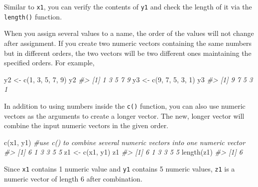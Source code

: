 \documentclass[
]{book}
\newenvironment{Shaded}{\begin{snugshade}}{\end{snugshade}}
\newcommand{\CommentTok}[1]{\textcolor[rgb]{0.56,0.35,0.01}{\textit{#1}}}
\newcommand{\DecValTok}[1]{\textcolor[rgb]{0.00,0.00,0.81}{#1}}
\newcommand{\FunctionTok}[1]{\textcolor[rgb]{0.00,0.00,0.00}{#1}}
\newcommand{\NormalTok}[1]{#1}
\newcommand{\OtherTok}[1]{\textcolor[rgb]{0.56,0.35,0.01}{#1}}
\newenvironment{blackbox}{
  \definecolor{shadecolor}{rgb}{0, 0, 0}  %
  \color{white}
  \begin{shaded}}
 {\end{shaded}}
\newenvironment{infobox}[1]
  {
  \begin{itemize}
  \renewcommand{\labelitemi}{
    \raisebox{-.7\height}[0pt][0pt]{
      {\setkeys{Gin}{width=3em,keepaspectratio}
        \texttt{[image: pics/\#1]}}
    }
  }
  \setlength{\fboxsep}{1em}
  \begin{blackbox}
  \item
  }
  {
  \end{blackbox}
  \end{itemize}
  }
\begin{document}
Similar to \texttt{x1}, you can verify the contents of \texttt{y1} and check the length of it via the \texttt{length()} function.

\begin{infobox}{caution}

When you assign several values to a name, the order of the values will not change after assignment. If you create two numeric vectors containing the same numbers but in different orders, the two vectors will be two different ones maintaining the specified orders. For example,

\begin{Shaded}
\begin{Highlighting}[]
\NormalTok{y2 }\OtherTok{\textless{}{-}} \FunctionTok{c}\NormalTok{(}\DecValTok{1}\NormalTok{, }\DecValTok{3}\NormalTok{, }\DecValTok{5}\NormalTok{, }\DecValTok{7}\NormalTok{, }\DecValTok{9}\NormalTok{)    }
\NormalTok{y2                        }
\CommentTok{\#\textgreater{} [1] 1 3 5 7 9}
\NormalTok{y3 }\OtherTok{\textless{}{-}} \FunctionTok{c}\NormalTok{(}\DecValTok{9}\NormalTok{, }\DecValTok{7}\NormalTok{, }\DecValTok{5}\NormalTok{, }\DecValTok{3}\NormalTok{, }\DecValTok{1}\NormalTok{)    }
\NormalTok{y3}
\CommentTok{\#\textgreater{} [1] 9 7 5 3 1}
\end{Highlighting}
\end{Shaded}

\end{infobox}

In addition to using numbers inside the \texttt{c()} function, you can also use numeric vectors as the arguments to create a longer vector. The new, longer vector will combine the input numeric vectors in the given order.

\begin{Shaded}
\begin{Highlighting}[]
\FunctionTok{c}\NormalTok{(x1, y1)          }\CommentTok{\#use c() to combine several numeric vectors into one numeric vector}
\CommentTok{\#\textgreater{} [1] 6 1 3 3 5 5}
\NormalTok{z1 }\OtherTok{\textless{}{-}} \FunctionTok{c}\NormalTok{(x1, y1)}
\NormalTok{z1}
\CommentTok{\#\textgreater{} [1] 6 1 3 3 5 5}
\FunctionTok{length}\NormalTok{(z1)}
\CommentTok{\#\textgreater{} [1] 6}
\end{Highlighting}
\end{Shaded}

Since \texttt{x1} contains 1 numeric value and \texttt{y1} contains 5 numeric values, \texttt{z1} is a numeric vector of length 6 after combination.
\end{document}
